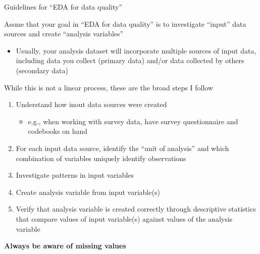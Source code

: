 \documentclass[8pt,ignorenonframetext,dvipsnames]{beamer}
\providecommand{\tightlist}{%
  \setlength{\itemsep}{0pt}\setlength{\parskip}{0pt}}
\renewcommand{\textbf}[1]{{\color{darkgray}\bfseries\fontfamily{Montserrat-TOsF}#1}}
\begin{document}
\begin{frame}{Guidelines for ``EDA for data quality''}

Assme that your goal in ``EDA for data quality'' is to investigate
``input'' data sources and create ``analysis variables''

\begin{itemize}
\tightlist
\item
  Usually, your analysis dataset will incorporate multiple sources of
  input data, including data you collect (primary data) and/or data
  collected by others (secondary data)
\end{itemize}

While this is not a linear process, these are the broad steps I follow

\begin{enumerate}
\def\labelenumi{\arabic{enumi}.}
\tightlist
\item
  Understand how inout data sources were created

  \begin{itemize}
  \tightlist
  \item
    e.g., when working with survey data, have survey questionnaire and
    codebooks on hand
  \end{itemize}
\item
  For each input data source, identify the ``unit of analysis'' and
  which combination of variables uniquely identify observations
\item
  Investigate patterns in input variables
\item
  Create analysis variable from input variable(s)
\item
  Verify that analysis variable is created correctly through descriptive
  statistics that compare values of input variable(s) against values of
  the analysis variable
\end{enumerate}

\textbf{Always be aware of missing values}

\end{frame}
\end{document}
